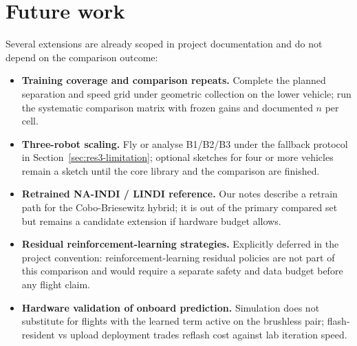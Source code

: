 \section{Future work}
\label{sec:conclusion-future}

Several extensions are already scoped in project documentation and do not depend on the comparison outcome:

\begin{itemize}
  \item \textbf{Training coverage and comparison repeats.} Complete the planned separation and speed
    grid under geometric collection on the lower vehicle; run the systematic comparison matrix with frozen gains and documented $n$
    per cell.
  \item \textbf{Three-robot scaling.} Fly or analyse B1/B2/B3 under the fallback protocol in
    Section~\ref{sec:res3-limitation}; optional sketches for four or more vehicles remain
    a sketch until the core library and the comparison are finished.
  \item \textbf{Retrained NA-INDI / LINDI reference.} Our notes describe
    a retrain path for the Cobo-Briesewitz hybrid; it is out of the primary compared set but remains
    a candidate extension if hardware budget allows.
  \item \textbf{Residual reinforcement-learning strategies.} Explicitly deferred in the project convention:
    reinforcement-learning residual policies are not part of this comparison and would require a
    separate safety and data budget before any flight claim.
  \item \textbf{Hardware validation of onboard prediction.} Simulation does not substitute for
    flights with the learned term active on the brushless pair; flash-resident vs upload deployment trades
    reflash cost against lab iteration speed.
\end{itemize}

